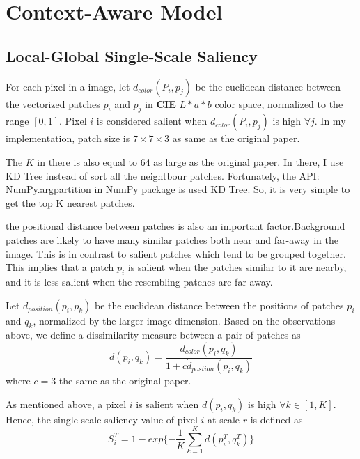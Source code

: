 \documentclass[10pt,twocolumn,letterpaper]{article}
\begin{document}
\section{Context-Aware Model}



\subsection{Local-Global Single-Scale Saliency}

For each pixel in a image, let $d_{color}(P_i,p_j)$ be the euclidean distance
between the vectorized patches $p_i$ and $p_j$ in \textbf{CIE} $L*a*b$ color
space, normalized to the range $[0,1]$. Pixel $i$ is considered
salient when $d_{color}(P_i,p_j)$ is high $\forall j$. In my implementation, patch size is $7\times7\times3$ as same as the original paper.
\par The $K$ in there is also equal to 64 as large as the original paper. In there, I use KD Tree instead of sort all the neightbour patches. Fortunately, the API: NumPy.argpartition in NumPy package is used KD Tree. So, it is very simple to get the top K nearest patches.
\par  the positional distance between patches is also an important factor.Background patches are likely to have many similar patches both near and far-away in the image. This is in contrast to salient patches which tend to
be grouped together. This implies that a patch $p_i$ is salient
when the patches similar to it are nearby, and it is less salient
when the resembling patches are far away.
\par Let $d_{position}(p_i,p_k)$ be the euclidean distance between the
positions of patches $p_i$ and $q_k$, normalized by the larger
image dimension. Based on the observations above, we
define a dissimilarity measure between a pair of patches as
\begin{equation}
d(p_i,q_k) = \frac{d_{color}(p_i, q_k)}{1+c\dot d_{postion}(p_i, q_k)}
\end{equation}
where $c = 3$ the same as the original paper.
\par As mentioned above, a pixel $i$ is salient when $d(p_i,q_k)$ is
high $\forall k\in [1,K]$. Hence, the single-scale saliency value of
pixel $i$ at scale $r$ is defined as
\begin{equation}
S_{i}^{T} = 1 - exp\{-\frac{1}{K}\sum_{k=1}^{K}d(p_{i}^{T}, q_{k}^{T})\}
\end{equation}
\end{document}
